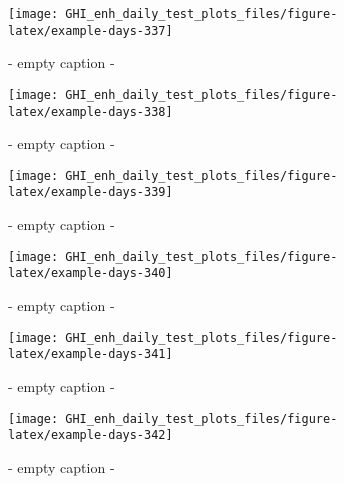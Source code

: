 \documentclass[
  10pt,
  a4paper,oneside]{article}
\begin{document}
\begin{figure}[H]

{\centering \texttt{[image: GHI\_enh\_daily\_test\_plots\_files/figure-latex/example-days-337]} 

}

\caption{ - empty caption - }\label{fig:example-days-337}
\end{figure}

\begin{figure}[H]

{\centering \texttt{[image: GHI\_enh\_daily\_test\_plots\_files/figure-latex/example-days-338]} 

}

\caption{ - empty caption - }\label{fig:example-days-338}
\end{figure}

\begin{figure}[H]

{\centering \texttt{[image: GHI\_enh\_daily\_test\_plots\_files/figure-latex/example-days-339]} 

}

\caption{ - empty caption - }\label{fig:example-days-339}
\end{figure}

\begin{figure}[H]

{\centering \texttt{[image: GHI\_enh\_daily\_test\_plots\_files/figure-latex/example-days-340]} 

}

\caption{ - empty caption - }\label{fig:example-days-340}
\end{figure}

\begin{figure}[H]

{\centering \texttt{[image: GHI\_enh\_daily\_test\_plots\_files/figure-latex/example-days-341]} 

}

\caption{ - empty caption - }\label{fig:example-days-341}
\end{figure}

\begin{figure}[H]

{\centering \texttt{[image: GHI\_enh\_daily\_test\_plots\_files/figure-latex/example-days-342]} 

}

\caption{ - empty caption - }\label{fig:example-days-342}
\end{figure}
\end{document}
